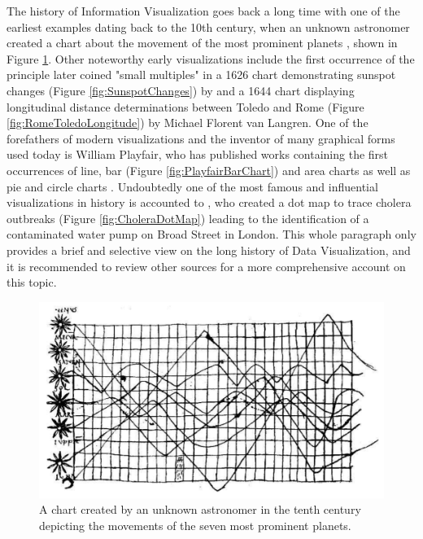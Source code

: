 The history of Information Visualization goes back a long time with one of the earliest examples dating back to the 10th century, when an unknown astronomer created a chart about the movement of the most prominent planets \parencite{InSomniumScripionus}, shown in Figure \ref{fig:PlanetaryMovements}. Other noteworthy early visualizations include the first occurrence of the principle \cite{VisualDisplayOfQuantitativeInformation} later coined "small multiples" in a 1626 chart demonstrating sunspot changes (Figure \ref{fig:SunspotChanges}) by \cite{RosaUrsina} and a 1644 chart displaying longitudinal distance determinations between Toledo and Rome (Figure \ref{fig:RomeToledoLongitude}) by Michael Florent van Langren. One of the forefathers of modern visualizations and the inventor of many graphical forms used today is William Playfair, who has published works containing the first occurrences of line, bar (Figure \ref{fig:PlayfairBarChart}) and area charts \parencite{CommercialAndPoliticalAtlas} as well as pie and circle charts \parencite{StatisticalBreviary}. Undoubtedly one of the most famous and influential visualizations in history is accounted to \cite{ModeOfCommunicationOfCholera}, who created a dot map to trace cholera outbreaks (Figure \ref{fig:CholeraDotMap}) leading to the identification of a contaminated water pump on Broad Street in London. This whole paragraph only provides a brief and selective view on the long history of Data Visualization, and it is recommended to review other sources \parencite{BriefHistoryOfDataVis} for a more comprehensive account on this topic.  

\begin{figure}[tp]
    \centering
    \includegraphics[keepaspectratio,width=\linewidth,height=\fullh / 3]
    {images/planetary-movements.png}
    \caption[Chart of Planetary Movements from the Tenth Century]{
        A chart created by an unknown astronomer in the tenth century depicting the movements of the seven most prominent planets. 
    }
    \label{fig:PlanetaryMovements}
\end{figure}

